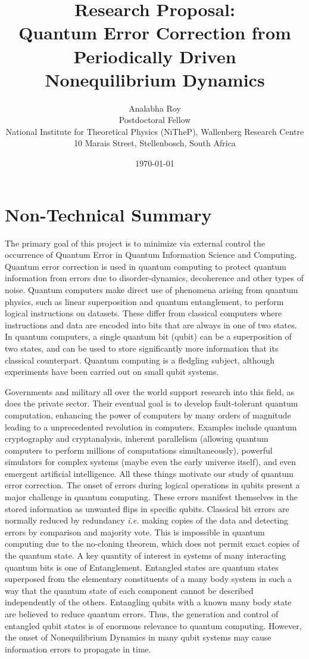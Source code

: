 \documentclass[a4paper,9pt]{article}
\title{Research Proposal:\\ Quantum Error Correction from Periodically Driven Nonequilibrium Dynamics }
\author{Analabha Roy\\Postdoctoral Fellow\\National Institute for Theoretical Physics (NiTheP), Wallenberg Research Centre\\10 Marais Street, Stellenbosch, South Africa}
\date{\today}
\begin{document}
 \maketitle
\section{Non-Technical Summary}
The primary goal of this project is to minimize via external control the occurrence of Quantum Error in Quantum Information Science and Computing. Quantum error correction is used in quantum computing to protect quantum information from errors due to disorder-dynamics, decoherence and other types of noise. Quantum computers make direct use of phenomena arising from quantum physics, such as linear superposition and quantum entanglement, to perform logical instructions on datasets. These differ from classical computers where instructions and data are encoded into bits that are always in one of two states. In quantum computers, a single quantum bit (qubit) can be a superposition of two states, and can be used to store significantly more information that its classical counterpart. Quantum computing is a fledgling subject, although experiments have been carried out on small qubit systems.

Governments and military all over the world support research into this field, as does the private sector. Their eventual goal is to develop fault-tolerant quantum computation, enhancing the power of computers by many orders of magnitude leading to a unprecedented revolution in computers. Examples include quantum cryptography and cryptanalysis, inherent parallelism (allowing quantum computers to perform millions of computations simultaneously), powerful simulators for complex systems (maybe even the early universe itself), and even emergent artificial intelligence. All these things motivate our study of quantum error correction.  The onset of errors during logical operations in qubits present a major challenge in quantum computing. These errors manifest themselves in the stored information as unwanted flips in specific qubits. Classical bit errors are normally reduced by redundancy \textit{i.e.} making copies of the data and detecting errors by comparison and majority vote. This is impossible in quantum computing due to the no-cloning theorem, which does not permit exact copies of the quantum state.  A key quantity of interest in systems of many interacting quantum bits is one of Entanglement. Entangled states are quantum states superposed from the elementary constituents of a many body system in such a way that the quantum state of each component cannot be described independently of the others. Entangling qubits with a known many body state are believed to reduce quantum errors.  Thus, the generation and control of entangled qubit states is of enormous relevance to quantum computing. However, the onset of Nonequilibrium Dynamics in many qubit systems may cause information errors to propagate in time.
\end{document}
